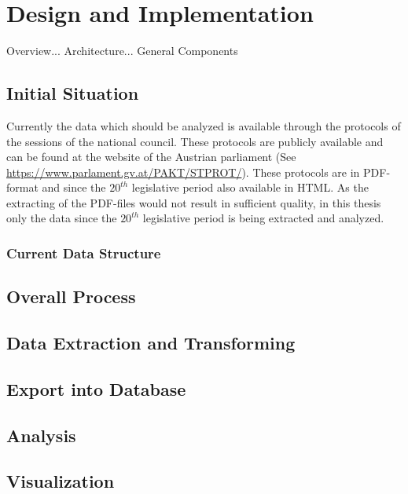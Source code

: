 \chapter{Design and Implementation}
\label{chap:implementation}

Overview... Architecture... General Components

\section{Initial Situation}
Currently the data which should be analyzed is available through the protocols of the sessions of the national council. These protocols are publicly available and can be found at the website of the Austrian parliament (See \url{https://www.parlament.gv.at/PAKT/STPROT/}). These protocols are in PDF-format and since the $20^{th}$ legislative period also available in HTML. As the extracting of the PDF-files would not result in sufficient quality, in this thesis only the data since the $20^{th}$ legislative period is being extracted and analyzed.

\subsection{Current Data Structure}


\section{Overall Process}


\section{Data Extraction and Transforming}

\section{Export into Database}

\section{Analysis}

\section{Visualization}

